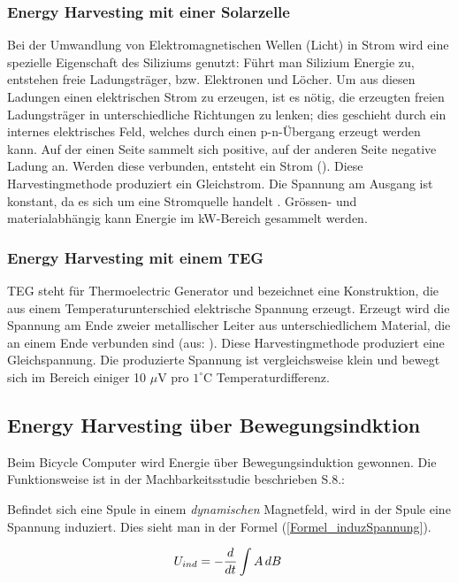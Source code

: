 \subsubsection{Energy Harvesting mit einer Solarzelle}\label{harv_solarzelle} 

Bei der Umwandlung von Elektromagnetischen Wellen (Licht) in Strom wird eine spezielle Eigenschaft des Siliziums genutzt: Führt man Silizium Energie zu, entstehen freie Ladungsträger, bzw. Elektronen und Löcher. Um aus diesen Ladungen einen elektrischen Strom zu erzeugen, ist es nötig, die erzeugten freien Ladungsträger in unterschiedliche Richtungen zu lenken; dies geschieht durch ein internes elektrisches Feld, welches durch einen p-n-Übergang erzeugt werden kann. Auf der einen Seite sammelt sich positive, auf der anderen Seite negative Ladung an. Werden diese verbunden, entsteht ein Strom (\cite{Internet_Solarzelle2}). 
Diese Harvestingmethode produziert ein Gleichstrom. Die Spannung am Ausgang ist konstant, da es sich um eine Stromquelle handelt . Grössen- und materialabhängig kann Energie im kW-Bereich gesammelt werden.

\subsubsection{Energy Harvesting mit einem TEG}\label{harv_TEG} 
TEG steht für Thermoelectric Generator und bezeichnet eine Konstruktion, die aus einem Temperaturunterschied elektrische Spannung erzeugt. Erzeugt wird die Spannung am Ende zweier metallischer Leiter aus unterschiedlichem Material, die an einem Ende verbunden sind (aus: \cite{Internet_Waerme}). Diese Harvestingmethode produziert eine Gleichspannung. Die produzierte Spannung ist vergleichsweise klein und bewegt sich im Bereich einiger 10 $\mu$V pro $1^\circ$C Temperaturdifferenz.


\subsection{Energy Harvesting über Bewegungsindktion}\label{harv_bewegung} 
Beim Bicycle Computer wird Energie über Bewegungsinduktion gewonnen. Die Funktionsweise ist in der Machbarkeitsstudie beschrieben \cite{PA_bicycle} S.8.:

Befindet sich eine Spule in einem \textit{dynamischen} \glqq Magnetfeld\grqq, wird in der Spule eine Spannung induziert. Dies sieht man in der Formel (\ref{Formel_induzSpannung}).

\begin{equation}
    U_{ind}=-\frac{d}{dt}\intop A\,dB \ \label{Formel_induzSpannung} 
\end{equation}

